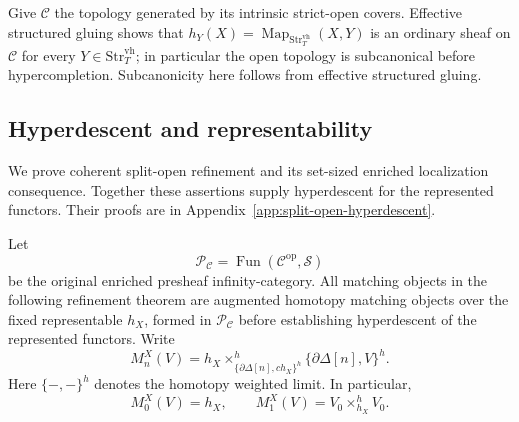 \documentclass[12pt]{amsart}
\theoremstyle{definition}
\theoremstyle{remark}
\numberwithin{equation}{section}
\newcommand{\op}{\mathrm{op}}
\DeclareMathOperator{\Map}{Map}
\DeclareMathOperator{\Fun}{Fun}
\begin{document}
Give $\mathcal C$ the topology generated by its intrinsic
strict-open covers. Effective structured gluing shows that
$h_Y(X)=\Map_{\mathrm{Str}_T^{\mathrm{vh}}}(X,Y)$ is an ordinary
sheaf on $\mathcal C$ for every
$Y\in\mathrm{Str}_T^{\mathrm{vh}}$; in particular the open topology
is subcanonical before hypercompletion. Subcanonicity here
follows from effective structured gluing.

\begin{samepage}
\subsection{Hyperdescent and representability}
We prove coherent split-open refinement and its
set-sized enriched localization consequence.
\label{subsec:banach-g2}
Together these assertions supply hyperdescent for the
represented functors. Their proofs are in
Appendix~\ref{app:split-open-hyperdescent}.
\end{samepage}

Let
\[
 \mathcal P_{\mathcal C}
 =\Fun(\mathcal C^{\op},\mathcal S)
\]
be the original enriched presheaf infinity-category.
All matching objects in the following refinement theorem
are augmented homotopy matching objects over the fixed
representable $h_X$, formed in $\mathcal P_{\mathcal C}$
before establishing hyperdescent of the represented functors.
Write
\[
 M_n^X(V)
 =
 h_X\times^h_{\{\partial\Delta[n],c h_X\}^h}
             \{\partial\Delta[n],V\}^h.
\]
Here $\{-,-\}^h$ denotes the homotopy weighted limit.
In particular,
\[
 M_0^X(V)=h_X,\qquad
 M_1^X(V)=V_0\times^h_{h_X}V_0.
\]
\end{document}
